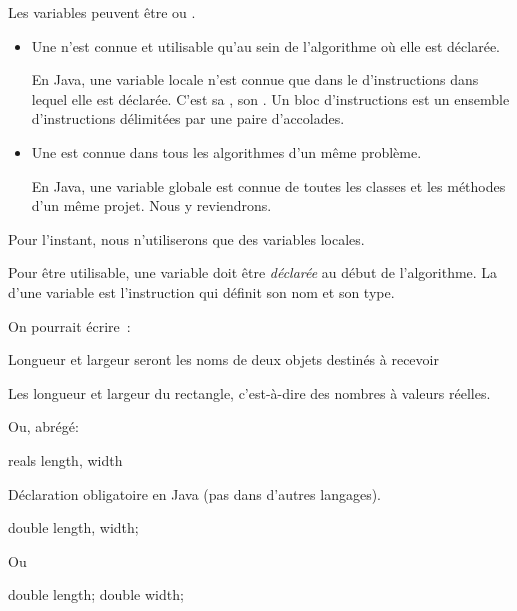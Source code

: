 \begin{frame}
  Les variables peuvent être  ou .

  \begin{itemize}
    \item Une  n'est
      connue et utilisable qu'au sein de l'algorithme où elle est
      déclarée.

      En Java, une variable locale n'est connue que dans le
       d'instructions dans lequel elle est déclarée.
      C'est sa , son .
      Un bloc d'instructions est un ensemble
      d'instructions délimitées par une paire d'accolades.

    \item Une  est
      connue dans tous les algorithmes d'un même problème.

      En Java, une variable globale est connue de toutes les
      classes et les méthodes d'un même projet. Nous y reviendrons.
  \end{itemize}

  Pour l'instant, nous n'utiliserons que des variables locales.
\end{frame}

\begin{frame}
  Pour être utilisable, une variable doit être \emph{déclarée} au
  début de l’algorithme. La 
  d’une variable est l’instruction qui définit son nom et son type.

  On pourrait écrire~:

  \begin{langagenaturel}
    Longueur et largeur seront les noms de deux 
    objets destinés à recevoir

    Les longueur et largeur du rectangle, 
    c’est-à-dire des nombres à valeurs réelles.

  \end{langagenaturel}

  Ou, abrégé:

  \begin{langagenaturel}
    reals length, width
  \end{langagenaturel}
\end{frame}

\begin{frame}[fragile]
  Déclaration obligatoire en Java (pas dans d'autres langages).

\begin{java}
double length, width;
\end{java}

Ou
\begin{java}
double length;
double width;
\end{java}
\end{frame}


